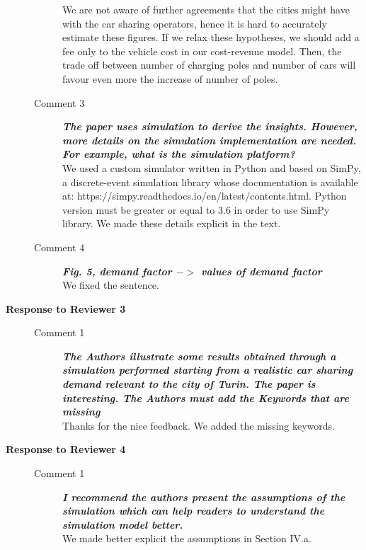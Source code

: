 \documentclass{paper}
\newcommand{\rev}[1]{\textbf{\textit{#1}}}
\newcommand{\ans}[1]{{\color{blue} #1}}
\begin{document}
\begin{description}
\begin{description}
{We are not aware of further agreements that the cities might have with the car sharing operators, hence it is hard to accurately estimate these figures. If we relax these hypotheses,  we should add a fee only to the vehicle cost in our cost-revenue model. Then, the trade off between number of charging poles and number of cars will favour even more the increase of number of poles.  %
}\\

\item[Comment 3] \rev{The paper uses simulation to derive the insights. However, more details on the simulation implementation are needed. For example, what is the simulation platform?}\\

\ans{We used a custom simulator written in Python and based on SimPy, a discrete-event simulation library whose documentation is available at: https://simpy.readthedocs.io/en/latest/contents.html. Python version must be greater or equal to 3.6 in order to use SimPy library. We made these details explicit in the text. }\\

\item[Comment 4] \rev{Fig. 5, demand factor $->$ values of demand factor}\\

\ans{We fixed the sentence. }

\end{description}

\pagebreak

\item[\textbf{Response to Reviewer 3}] \hfill
\begin{description}

\item[Comment 1] \rev{The Authors illustrate some results obtained through a simulation performed starting from a realistic car sharing demand relevant to the city of Turin. The paper is interesting.
The Authors must add the Keywords that are missing
}\\

\ans{Thanks for the nice feedback. We added the missing keywords.}\\

\end{description}


\pagebreak

\item[\textbf{Response to Reviewer 4}] \hfill
\begin{description}

\item[Comment 1] \rev{I recommend the authors present the assumptions of the simulation which can help readers to understand the simulation model better.}\\

\ans{We made better explicit the assumptions in Section IV.a.}\\

\end{description}

\end{description}
\end{document}

